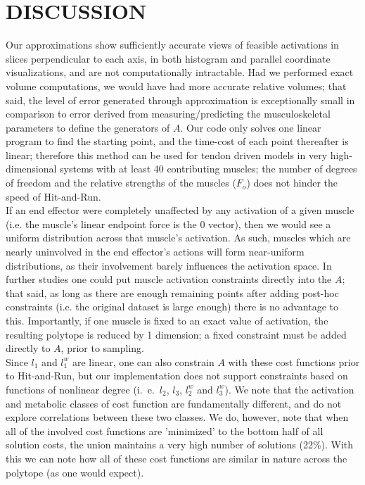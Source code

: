 \section{DISCUSSION}

Our approximations show sufficiently accurate views of feasible activations in slices perpendicular to each axis, in both histogram and parallel coordinate visualizations, and are not computationally intractable.
Had we performed exact volume computations, we would have had more accurate relative volumes; that said, the level of error generated through approximation is exceptionally small in comparison to error derived from measuring/predicting the musculoskeletal parameters to define the generators of $A$.
Our code only solves one linear program to find the starting point, and the time-cost of each point thereafter is linear; therefore this method can be used for tendon driven models in very high-dimensional systems with at least 40 contributing muscles; the number of degrees of freedom and the relative strengths of the muscles ($F_o$) does not hinder the speed of Hit-and-Run.\\

If an end effector were completely unaffected by any activation of a given muscle (i.e. the muscle's linear endpoint force is the 0 vector), then we would see a uniform distribution across that muscle's activation. As such, muscles which are nearly uninvolved in the end effector's actions will form near-uniform distributions, as their involvement barely influences the activation space.
In further studies one could put muscle activation constraints directly into the $A$; that said, as long as there are enough remaining points after adding post-hoc constraints (i.e. the original dataset is large enough) there is no advantage to this.
Importantly, if one muscle is fixed to an exact value of activation, the resulting polytope is reduced by 1 dimension; a fixed constraint must be added directly to $A$, prior to sampling.\\
Since $l_1$ and $l_1^w$ are linear, one can also constrain $A$ with these cost functions prior to Hit-and-Run, but our implementation does not support constraints based on functions of nonlinear degree (i.\ e.\ $l_2$, $l_3$, $l_2^w$ and $l_3^w$).
We note that the activation and metabolic classes of cost function are fundamentally different, and do not explore correlations between these two classes.
We do, however, note that when all of the involved cost functions are 'minimized' to the bottom half of all solution costs, the union maintains a very high number of solutions (22\%).
With this we can note how all of these cost functions are similar in nature across the polytope (as one would expect).\\

